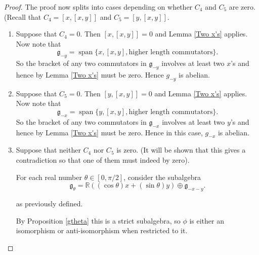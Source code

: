 \documentclass[honours]{UNSWthesis}
\newcommand{\R}{\mathbb{R}}
\newcommand{\g}{\mathfrak{g}}
\newcommand{\1}{\mathbf{e}_{1}}
\newcommand{\2}{\mathbf{e}_{3}}
\newcommand{\3}{\mathbf{e}_{3}}
\DeclareMathOperator{\spn}{span}
\begin{document}
\begin{proof}
The proof now splits into cases depending on whether $C_{4}$ and $C_{5}$ are zero. (Recall that $C_4=[x,[x,y]]$ and $C_5 = [y,[x,y]]$.


\begin{enumerate}
\item Suppose that $C_4=0$. Then $[x,[x,y]]=0$ and Lemma \ref{Two x's} applies. Now note that 
\[
\g_{-y} = \spn \{ x, [x,y], \text{higher length commutators}\}.
\]
So the bracket of any two commutators in $\g_{-y}$ involves at least two $x$'s and hence by Lemma \ref{Two x's} must be zero. Hence $g_{-y}$ is abelian. 

\item Suppose that $C_5=0$. Then $[y,[x,y]]=0$ and Lemma \ref{Two x's} applies. Now note that 
\[
\g_{-x} = \spn \{ y, [x,y], \text{higher length commutators}\}.
\]
So the bracket of any two commutators in $\g_{-x}$ involves at least two $y$'s and hence by Lemma \ref{Two x's} must be zero. Hence in this case, $g_{-x}$ is abelian.

\item Suppose that neither $C_4$ nor $C_5$ is zero. (It will be shown that this gives a contradiction so that one of them must indeed by zero). 

For each real number $\theta \in [0,\pi/2]$, consider the subalgebra 
\[
\g_\theta= \R((\cos{\theta})x + (\sin{\theta})y) \oplus \g_{-x-y}.
\]

as previously defined.

By Proposition \ref{gtheta} this is a strict subalgebra, so $\phi$ is either an isomorphism or anti-isomorphism when restricted to it. 


\end{enumerate}
\end{proof}
\end{document}
